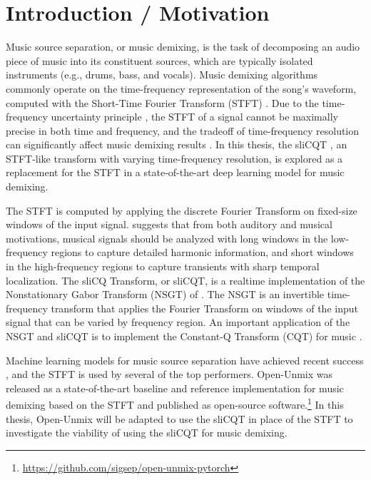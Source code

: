 \documentclass[letter,12pt]{article}
\title{\vspace{-2.25em}\ThesisTitle\vspace{-0.5em}}
\author{Sevag Hanssian}
\date{\vspace{-0.5em}October 17, 2021\vspace{-1.25em}}
\begin{document}
\maketitle

\section{Introduction / Motivation}

Music source separation, or music demixing, is the task of decomposing an audio piece of music into its constituent sources, which are typically isolated instruments (e.g., drums, bass, and vocals). Music demixing algorithms commonly operate on the time-frequency representation of the song's waveform, computed with the Short-Time Fourier Transform (STFT) \parencite{musicsepgood}. Due to the time-frequency uncertainty principle \parencite{gabor1946}, the STFT of a signal cannot be maximally precise in both time and frequency, and the tradeoff of time-frequency resolution can significantly affect music demixing results \parencite{tftradeoff1}. In this thesis, the sliCQT \parencite{slicq}, an STFT-like transform with varying time-frequency resolution, is explored as a replacement for the STFT in a state-of-the-art deep learning model for music demixing.

The STFT is computed by applying the discrete Fourier Transform on fixed-size windows of the input signal. \textcite{doerflerphd} suggests that from both auditory and musical motivations, musical signals should be analyzed with long windows in the low-frequency regions to capture detailed harmonic information, and short windows in the high-frequency regions to capture transients with sharp temporal localization. The sliCQ Transform, or sliCQT, is a realtime implementation of the Nonstationary Gabor Transform (NSGT) of \textcite{balazs}. The NSGT is an invertible time-frequency transform that applies the Fourier Transform on windows of the input signal that can be varied by frequency region. An important application of the NSGT and sliCQT is to implement the Constant-Q Transform (CQT) for music \parencite{jbrown}.

Machine learning models for music source separation have achieved recent success \parencite{sisec2018}, and the STFT is used by several of the top performers. Open-Unmix \parencite{umx} was released as a state-of-the-art baseline and reference implementation for music demixing based on the STFT and published as open-source software.\footnote{\url{https://github.com/sigsep/open-unmix-pytorch}} In this thesis, Open-Unmix will be adapted to use the sliCQT in place of the STFT to investigate the viability of using the sliCQT for music demixing.
\end{document}
